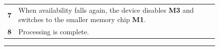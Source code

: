 \begin{figure}[t]
\begin{minipage}[t]{0.5\textwidth}
\begin{tabularx}{\columnwidth}{cX}
\textbf{7} &
When availability falls again, the device disables \textbf{M3} and
switches to the smaller memory chip \textbf{M1}.
\\

\textbf{8} &
Processing is complete.
\\

\end{tabularx}
\end{minipage}
\vspace{-0.1in}
\caption{\normalsize {}}

\label{figure-transitiongraph}
\vspace{0.10in}
\hrule
\vspace{-0.20in}
\end{figure}
